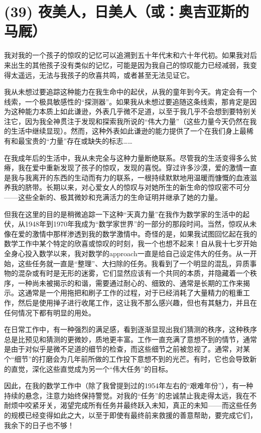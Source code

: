 \section{(39) 夜美人，日美人（或：奥吉亚斯的马厩）}

我对我的一个孩子的惊叹的记忆可以追溯到五十年代末和六十年代初。如果我对后来出生的其他孩子没有类似的记忆，可能是因为我自己的惊叹能力已经减弱，我变得太遥远，无法与我孩子的欣喜共鸣，或者甚至无法见证它。

我从未想过要追踪这种能力在我生命中的起伏，从我的童年到今天。肯定会有一个线索，一个极具敏感性的``探测器''。如果我从未想过要追随这条线索，那肯定是因为这种能力本质上如此谦逊，外表几乎微不足道，以至于我几乎不会想到要特别关注它，因为我全神贯注于发现和探索我所说的``伟大力量''（这些力量今天仍然在我的生活中继续显现）。然而，这种外表如此谦逊的能力提供了一个在我们身上最稀有和最宝贵的``力量''存在或缺失的标志……

在我成年后的生活中，我从未完全与这种力量断绝联系。尽管我的生活变得多么贫瘠，我在爱中重新发现了孩子的惊叹，发现的喜悦。穿过许多沙漠，爱的激情一直是我与我离开的东西的生动而有力的联系，一根持续默默地用温暖而慷慨的血液滋养我的脐带。长期以来，对心爱女人的惊叹与对她所生的新生命的惊叹密不可分——这些全新的、极其微妙和充满活力的生命证明并继承了她的力量。

但我在这里的目的是稍微追踪一下这种``天真力量''在我作为数学家的生活中的起伏，从1948年到1970年我成为``数学家世界''的一部分的那段时间。当然，惊叹从未像在爱的激情中那样渗透到我的数学激情中。奇怪的是，如果我试图回忆起在我的数学工作中某个特定的欣喜或惊叹的时刻，我一个也想不起来！自从我十七岁开始全身心投入数学以来，我对数学的approach一直是给自己设定伟大的任务。从一开始，这些任务就一直是``整理''、大扫除的任务。我看到了一个明显的混乱，异质事物的混杂或有时是无形的迷雾，它们显然应该有一个共同的本质，并隐藏着一个秩序，一种尚未被揭示的和谐，需要通过耐心的、细致的、通常是长期的工作来揭示。这通常是一个用拖把和刷子工作的过程，对于已经消耗了大量精力的粗重工作，然后是使用掸子进行收尾工作，这让我不那么感兴趣，但也有其魅力，并且在任何情况下都有明显的用处。

在日常工作中，有一种强烈的满足感，看到逐渐显现出我们猜测的秩序，这种秩序总是比预见和猜测的更微妙，质地更丰富。工作一直充满了意想不到的情节，通常是由于对似乎是微不足道的细节的检查，而这些细节之前被忽视了。通常，对某个``细节''的打磨会为几年前所做的工作投下意想不到的光芒。有时，它也会导致新的直觉，深化这些直觉成为另一个``伟大任务''的目标。

因此，在我的数学工作中（除了我曾提到过的1954年左右的``艰难年份''），有一种持续的悬念，注意力始终保持警觉。对我的``任务''的忠诚禁止我走得太远，我在不耐烦中咬紧牙关，渴望完成所有任务并最终跃入未知，真正的未知——而这些任务的规模已经变得如此之大，以至于即使有最终前来救援的善意帮助，要完成它们，我余下的日子也不够！

